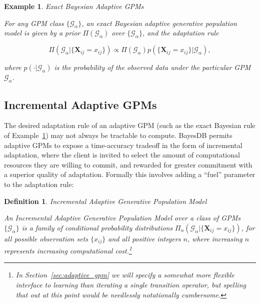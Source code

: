\documentclass[10pt,letterpaper]{article}
\newtheorem{example}{Example}[section]
\newtheorem{definition}{Definition}[section]
\newcommand{\set}[1]{\{#1\}}
\newcommand{\G}{\mathcal{G}}
\begin{document}
\begin{example} Exact Bayesian Adaptive GPMs

For any GPM class $\{\G_\alpha\}$, an \emph{exact Bayesian adaptive
  generative population model} is given by a prior
$\Pi(\G_\alpha)$ over
$\{\G_\alpha\}$, and the adaptation rule

\[ \Pi(\G_\alpha|\set{\mathbf{X}_{ij} = x_{ij}}) \propto \Pi(\G_\alpha)
 p(\set{\mathbf{X}_{ij} = x_{ij}}|\G_\alpha), \]

where $p(\cdot|\G_\alpha)$ is the probability of the observed data under
the particular GPM $\G_\alpha$. \label{ex:exact-bayes}

\end{example}

\subsection{Incremental Adaptive GPMs}
\label{sec:formalism-incremental-gpm}

The desired adaptation rule of an adaptive GPM (such as the exact
Bayesian rule of Example~\ref{ex:exact-bayes}) may not always be
tractable to compute.  BayesDB permits adaptive GPMs to expose a
time-accuracy tradeoff in the form of incremental adaptation, where
the client is invited to select the amount of computational resources
they are willing to commit, and rewarded for greater commitment with a
superior quality of adaptation.  Formally this involves adding a ``fuel''
parameter to the adaptation rule:

\begin{definition} Incremental Adaptive Generative Population Model
\label{def:incremental-adaptive}

An \emph{Incremental Adaptive Generative Population Model} over a
class of GPMs $\{\G_\alpha\}$ is a family of conditional probability
distributions $\Pi_n(\G_\alpha|\set{\mathbf{X}_{ij} = x_{ij}})$, for all
possible observation sets $\{x_{ij}\}$ and all positive integers $n$,
where increasing $n$ represents increasing computational
cost.\footnote{In Section~\ref{sec:adaptive_gpm} we will specify a
  somewhat more flexible interface to learning than iterating a single
  transition operator, but spelling that out at this point would be
  needlessly notationally cumbersome.}
\end{definition}
\end{document}
